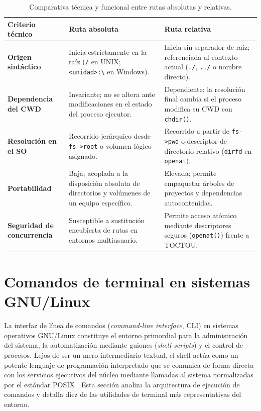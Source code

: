 \documentclass[12pt]{article}
\begin{document}
\begin{table}[htbp]
\centering
\footnotesize
\renewcommand{\arraystretch}{1.08}
\renewcommand{\tabularxcolumn}[1]{m{#1}}
\setlength{\emergencystretch}{1.5em}
\caption{Comparativa técnica y funcional entre rutas absolutas y relativas.}
\label{tab:comparativaRutasSistemas}
\begin{tabularx}{\textwidth}{>{\centering\arraybackslash}m{2.8cm} X X}
\toprule
\textbf{Criterio técnico} & \textbf{Ruta absoluta} & \textbf{Ruta relativa} \\
\midrule
\textbf{Origen sintáctico} & Inicia estrictamente en la raíz (\texttt{/} en UNIX; \texttt{<unidad>:\textbackslash} en Windows). & Inicia sin separador de raíz; referenciada al contexto actual (\texttt{./}, \texttt{../} o nombre directo). \\
\addlinespace
\textbf{Dependencia del CWD} & Invariante; no se altera ante modificaciones en el estado del proceso ejecutor. & Dependiente; la resolución final cambia si el proceso modifica su CWD con \texttt{chdir()}. \\
\addlinespace
\textbf{Resolución en el SO} & Recorrido jerárquico desde \texttt{fs->root} o volumen lógico asignado. & Recorrido a partir de \texttt{fs->pwd} o descriptor de directorio relativo (\texttt{dirfd} en \texttt{openat}). \\
\addlinespace
\textbf{Portabilidad} & Baja; acoplada a la disposición absoluta de directorios y volúmenes de un equipo específico. & Elevada; permite empaquetar árboles de proyectos y dependencias autocontenidas. \\
\addlinespace
\textbf{Seguridad de concurrencia} & Susceptible a sustitución encubierta de rutas en entornos multiusuario. & Permite acceso atómico mediante descriptores seguros (\texttt{openat()}) frente a TOCTOU. \\
\bottomrule
\end{tabularx}
\end{table}

\section{Comandos de terminal en sistemas GNU/Linux}
\label{sec:comandosTerminalLinux}

La interfaz de línea de comandos (\textit{command-line interface}, CLI) en sistemas operativos GNU/Linux constituye el entorno primordial para la administración del sistema, la automatización mediante guiones (\textit{shell scripts}) y el control de procesos. Lejos de ser un mero intermediario textual, el shell actúa como un potente lenguaje de programación interpretado que se comunica de forma directa con los servicios ejecutivos del núcleo mediante llamadas al sistema normalizadas por el estándar POSIX \parencite[\S 2.2, p.\ 48]{silberschatz2006fundamentos}. Esta sección analiza la arquitectura de ejecución de comandos y detalla diez de las utilidades de terminal más representativas del entorno.
\end{document}
